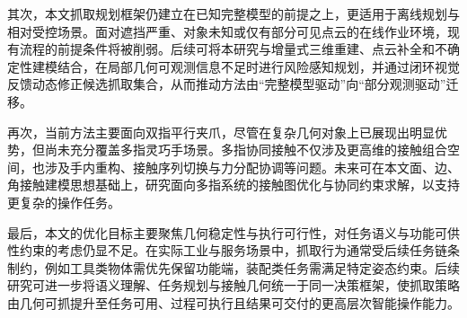 其次，本文抓取规划框架仍建立在已知完整模型的前提之上，更适用于离线规划与相对受控场景。面对遮挡严重、对象未知或仅有部分可见点云的在线作业环境，现有流程的前提条件将被削弱。后续可将本研究与增量式三维重建、点云补全和不确定性建模结合，在局部几何可观测信息不足时进行风险感知规划，并通过闭环视觉反馈动态修正候选抓取集合，从而推动方法由“完整模型驱动”向“部分观测驱动”迁移。

再次，当前方法主要面向双指平行夹爪，尽管在复杂几何对象上已展现出明显优势，但尚未充分覆盖多指灵巧手场景。多指协同接触不仅涉及更高维的接触组合空间，也涉及手内重构、接触序列切换与力分配协调等问题。未来可在本文面、边、角接触建模思想基础上，研究面向多指系统的接触图优化与协同约束求解，以支持更复杂的操作任务。

最后，本文的优化目标主要聚焦几何稳定性与执行可行性，对任务语义与功能可供性约束的考虑仍显不足。在实际工业与服务场景中，抓取行为通常受后续任务链条制约，例如工具类物体需优先保留功能端，装配类任务需满足特定姿态约束。后续研究可进一步将语义理解、任务规划与接触几何统一于同一决策框架，使抓取策略由几何可抓提升至任务可用、过程可执行且结果可交付的更高层次智能操作能力。

